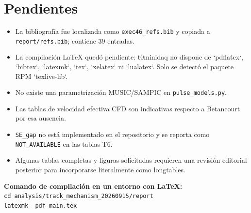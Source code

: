 \chapter{Pendientes}
\begin{itemize}
\item La bibliografía fue localizada como \texttt{exec46\_refs.bib} y copiada a \texttt{report/refs.bib}; contiene 39 entradas.
\item La compilación LaTeX quedó pendiente: t0minidaq no dispone de `pdflatex`, `bibtex`, `latexmk`, `tex`, `xelatex` ni `lualatex`. Solo se detectó el paquete RPM `texlive-lib`.
\item No existe una parametrización MUSIC/SAMPIC en \texttt{pulse\_models.py}.
\item Las tablas de velocidad efectiva CFD son indicativas respecto a Betancourt por esa ausencia.
\item \texttt{SE\_gap} no está implementado en el repositorio y se reporta como \texttt{NOT\_AVAILABLE} en las tablas T6.
\item Algunas tablas completas y figuras solicitadas requieren una revisión editorial posterior para incorporarse literalmente como longtables.
\end{itemize}
\textbf{Comando de compilación en un entorno con LaTeX:}\\
\texttt{cd analysis/track\_mechanism\_20260915/report \\ latexmk -pdf main.tex}
